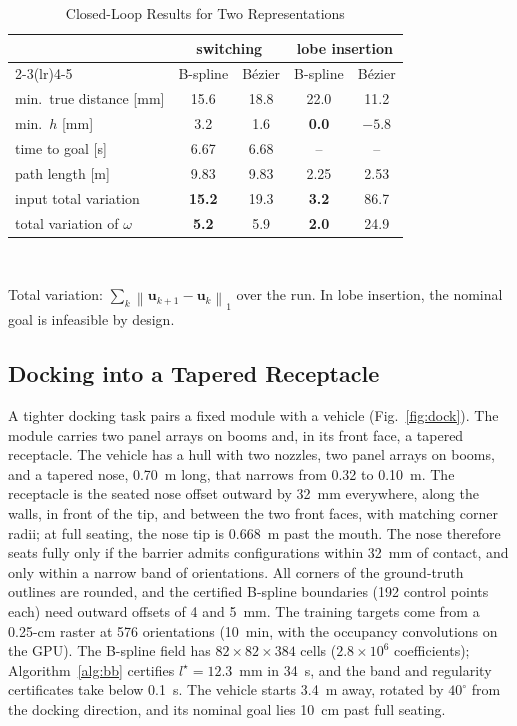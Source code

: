 \documentclass[journal]{IEEEtran}
\theoremstyle{definition}
\newcommand{\norm}[1]{\left\lVert #1\right\rVert}
\begin{document}
\begin{table}[t]
\caption{Closed-Loop Results for Two Representations}
\label{tab:tasks}
\centering
\footnotesize
\setlength{\tabcolsep}{4.5pt}
\renewcommand{\arraystretch}{1.05}
\begin{tabular}{lcccc}
\toprule
& \multicolumn{2}{c}{switching} & \multicolumn{2}{c}{lobe insertion}\\
\cmidrule(lr){2-3}\cmidrule(lr){4-5}
& B-spline & B\'ezier & B-spline & B\'ezier\\
\midrule
min.\ true distance [mm] & 15.6 & 18.8 & 22.0 & 11.2\\
min.\ $h$ [mm] & 3.2 & 1.6 & \textbf{0.0} & $-5.8$\\
time to goal [s] & 6.67 & 6.68 & -- & --\\
path length [m] & 9.83 & 9.83 & 2.25 & 2.53\\
input total variation & \textbf{15.2} & 19.3 & \textbf{3.2} & 86.7\\
total variation of $\omega$ & \textbf{5.2} & 5.9 & \textbf{2.0} & 24.9\\
\bottomrule
\end{tabular}
\\[3pt]
\parbox{\columnwidth}{\footnotesize Total variation: $\sum_k\norm{\mathbf u_{k+1}-\mathbf u_k}_1$
over the run. In lobe insertion, the nominal goal is infeasible by design.}
\end{table}

\subsection{Docking into a Tapered Receptacle}\label{sec:exp-probe}
A tighter docking task pairs a fixed module with a vehicle (Fig.~\ref{fig:dock}). The module carries
two panel arrays on booms and, in its front face, a tapered receptacle. The vehicle has a hull with
two nozzles, two panel arrays on booms, and a tapered nose, 0.70~m long, that narrows from 0.32 to
0.10~m. The receptacle is the seated nose offset outward by 32~mm everywhere, along the walls, in
front of the tip, and between the two front faces, with matching corner radii; at full seating, the
nose tip is 0.668~m past the mouth. The nose therefore seats fully only if the barrier admits
configurations within 32~mm of contact, and only within a narrow band of orientations. All corners
of the ground-truth outlines are rounded, and the certified B-spline boundaries (192 control points
each) need outward offsets of 4 and 5~mm. The training targets come from a 0.25-cm raster at 576
orientations (10~min, with the occupancy convolutions on the GPU). The B-spline field has
$82\times82\times384$ cells ($2.8\times10^6$ coefficients); Algorithm~\ref{alg:bb} certifies
$l^\star=12.3$~mm in 34~s, and the band and regularity certificates take below 0.1~s. The vehicle
starts 3.4~m away, rotated by $40^\circ$ from the docking direction, and its nominal goal lies 10~cm
past full seating.
\end{document}
